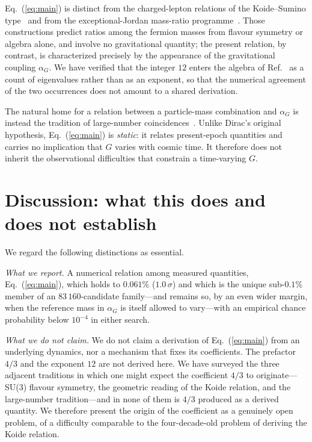 \documentclass[aps,prd,preprint,amsmath,amssymb,nofootinbib]{revtex4-2}
\begin{document}
Eq.~(\ref{eq:main}) is distinct from the charged-lepton relations of the
Koide--Sumino type~\cite{koide1983,sumino2009} and from the exceptional-Jordan
mass-ratio programme~\cite{singh2021}. Those constructions predict ratios among
the fermion masses from flavour symmetry or algebra alone, and involve no
gravitational quantity; the present relation, by contrast, is characterized
precisely by the appearance of the gravitational coupling $\alpha_G$. We have
verified that the integer $12$ enters the algebra of Ref.~\cite{singh2021} as a
count of eigenvalues rather than as an exponent, so that the numerical
agreement of the two occurrences does not amount to a shared derivation.

The natural home for a relation between a particle-mass combination and
$\alpha_G$ is instead the tradition of large-number
coincidences~\cite{dirac1938,wesson1980}. Unlike Dirac's original hypothesis,
Eq.~(\ref{eq:main}) is \emph{static}: it relates present-epoch quantities and
carries no implication that $G$ varies with cosmic time. It therefore does not
inherit the observational difficulties that constrain a time-varying $G$.

\section{Discussion: what this does and does not establish}
\label{sec:discussion}

We regard the following distinctions as essential.

\emph{What we report.} A numerical relation among measured quantities,
Eq.~(\ref{eq:main}), which holds to $0.061\%$ ($1.0\,\sigma$) and which is
the unique sub-$0.1\%$ member of an $83\,160$-candidate family---and remains
so, by an even wider margin, when the reference mass in $\alpha_G$ is itself
allowed to vary---with an empirical chance probability below $10^{-4}$ in
either search.

\emph{What we do not claim.} We do not claim a derivation of
Eq.~(\ref{eq:main}) from an underlying dynamics, nor a mechanism that fixes its
coefficients. The prefactor $4/3$ and the exponent $12$ are not derived here.
We have surveyed the three adjacent traditions in which one might expect the
coefficient $4/3$ to originate---SU(3) flavour symmetry, the geometric reading
of the Koide relation, and the large-number tradition---and in none of them is
$4/3$ produced as a derived quantity. We therefore present the origin of the
coefficient as a genuinely open problem, of a difficulty comparable to the
four-decade-old problem of deriving the Koide relation.
\end{document}
